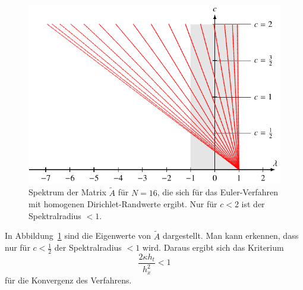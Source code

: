 \begin{figure}
\centering
\includegraphics{chapters/70-pde/images/explizitspektrum.pdf}
\caption{Spektrum der Matrix $\tilde{A}$ für $N=16$,
die sich für das Euler-Verfahren mit
homogenen Dirichlet-Randwerte ergibt.
Nur für $c<2$ ist der Spektralradius $<1$.
\label{buch:pde:waerme:explizitspektrum}}
\end{figure}
In Abbildung~\ref{buch:pde:waerme:explizitspektrum} sind die Eigenwerte
von $\tilde{A}$ dargestellt.
Man kann erkennen, dass nur für $c<\frac12$ der Spektralradius $<1$
wird.
Daraus ergibt sich das Kriterium
\[
\frac{2\kappa h_t}{h_x^2} < 1
\]
für die Konvergenz des Verfahrens.

